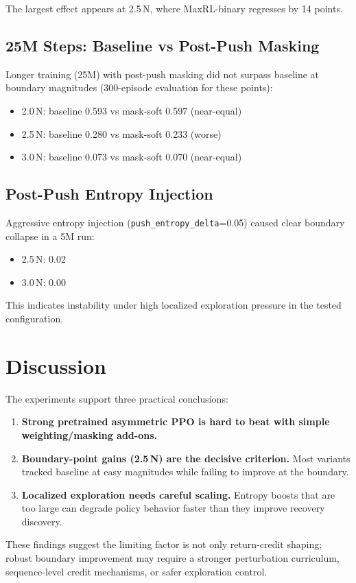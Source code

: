 \documentclass[letterpaper, 10 pt, conference]{ieeeconf}
\begin{document}
The largest effect appears at 2.5\,N, where MaxRL-binary regresses by 14 points.

\subsection{25M Steps: Baseline vs Post-Push Masking}
Longer training (25M) with post-push masking did not surpass baseline at boundary magnitudes (300-episode evaluation for these points):
\begin{itemize}
  \item 2.0\,N: baseline 0.593 vs mask-soft 0.597 (near-equal)
  \item 2.5\,N: baseline 0.280 vs mask-soft 0.233 (worse)
  \item 3.0\,N: baseline 0.073 vs mask-soft 0.070 (near-equal)
\end{itemize}

\subsection{Post-Push Entropy Injection}
Aggressive entropy injection (\texttt{push\_entropy\_delta}=0.05) caused clear boundary collapse in a 5M run:
\begin{itemize}
  \item 2.5\,N: 0.02
  \item 3.0\,N: 0.00
\end{itemize}
This indicates instability under high localized exploration pressure in the tested configuration.

\section{Discussion}
The experiments support three practical conclusions:
\begin{enumerate}
  \item \textbf{Strong pretrained asymmetric PPO is hard to beat with simple weighting/masking add-ons.}
  \item \textbf{Boundary-point gains (2.5\,N) are the decisive criterion.} Most variants tracked baseline at easy magnitudes while failing to improve at the boundary.
  \item \textbf{Localized exploration needs careful scaling.} Entropy boosts that are too large can degrade policy behavior faster than they improve recovery discovery.
\end{enumerate}

These findings suggest the limiting factor is not only return-credit shaping; robust boundary improvement may require a stronger perturbation curriculum, sequence-level credit mechanisms, or safer exploration control.
\end{document}
